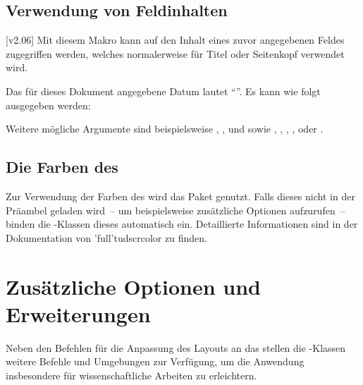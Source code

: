 \begin{DeclareEntity*}{}
\begin{DeclareEntity*}{}
\begin{DeclareEntity*}{}
\begin{quoting}[rightmargin=0pt]
\begin{Code}[escapechar=§]
\end{Code}
\end{quoting}



\subsection{%
  Verwendung von Feldinhalten%
}
%
\begin{Declaration}
  {}
  [v2.06]
\printdeclarationlist
%
Mit diesem Makro kann auf den Inhalt eines zuvor angegebenen Feldes zugegriffen 
werden, welches normalerweise für Titel oder Seitenkopf verwendet wird. 
%
\begin{Example}
Das für dieses Dokument angegebene Datum lautet \enquote{}. Es 
kann wie folgt ausgegeben werden:
\begin{Code}
\end{Code}
\end{Example}
%
Weitere mögliche Argumente sind beispielsweise , 
,  und  sowie ,
, , ,  oder
.
\end{Declaration}



\subsection{Die Farben des \CDs}
%
Zur Verwendung der Farben des \CDs wird das Paket  
genutzt. Falls dieses nicht in der Präambel geladen wird~-- um beispielsweise 
zusätzliche Optionen aufzurufen~-- binden die \TUDScript-Klassen dieses 
automatisch ein. Detaillierte Informationen sind in der Dokumentation von 
\Package'full'{tudscrcolor} zu finden.%
%



\section{Zusätzliche Optionen und Erweiterungen}
%
%
Neben den Befehlen für die Anpassung des Layouts an das \TUDCD stellen die 
\TUDScript-Klassen weitere Befehle und Umgebungen zur Verfügung, um die 
Anwendung insbesondere für wissenschaftliche Arbeiten zu erleichtern.




\end{DeclareEntity*}
\end{DeclareEntity*}
\end{DeclareEntity*}
